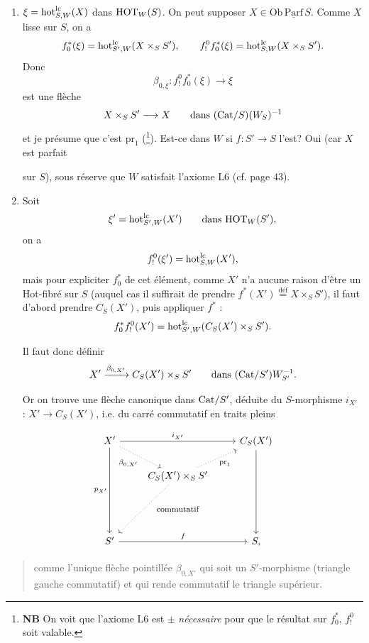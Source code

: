 \begin{enumerate}
\item[] $\xi=\mathrm{hot}^{\mathrm{lc}}_{S,W}(X)$ dans $\mathrm{HOT}_W(S)$. On peut supposer $X\in\mathrm{Ob}\,\underline{\mathrm{Parf}}\,S$. Comme $X$ lisse sur $S$, on a
\[f_0^*(\xi)=\mathrm{hot}^{\mathrm{lc}}_{S',W}(X\times_S S'),\qquad f_!^0f_0^*(\xi)=\mathrm{hot}^{\mathrm{lc}}_{S,W}(X\times_S S').\]
Donc
\[\beta_{0,\xi} : f_!^0f_0^*(\xi)\longrightarrow\xi\]
est une flèche
\[X\times_S S'\longrightarrow X\qquad\text{dans }(\mathrm{Cat}/S)(W_S)^{-1}\]
et je présume que c'est $\mathrm{pr}_1$ (\footnote[78]{\textbf{NB} On voit que l'axiome L6 est $\pm$ \textit{nécessaire} pour que le résultat sur $f_0^*$, $f_!^0$ soit valable.}). Est-ce dans $W$ si $f : S'\longrightarrow S$ l'est? Oui (car $X$ est parfait


sur $S$), sous réserve que $W$ satisfait l'axiome L6 (cf. page 43).

\item[2)] Soit
\[\xi'=\mathrm{hot}^{\mathrm{lc}}_{S',W}(X')\qquad\text{dans }\mathrm{HOT}_W(S'),\]
on a
\[f_!^0(\xi')=\mathrm{hot}^{\mathrm{lc}}_{S,W}(X'),\]
mais pour expliciter $f_0^*$ de cet élément, comme $X'$ n'a aucune raison d'être un Hot-fibré sur $S$ (auquel cas il suffirait de prendre $f^*(X')\overset{\text{déf}}{=}X\times_S S'$), il faut d'abord prendre $C_S(X')$, puis appliquer $f^*$ :
\[f_0^*f_!^0(X')=\mathrm{hot}^{\mathrm{lc}}_{S',W}(C_S(X')\times_S S').\]

Il faut donc définir
\[X'\xrightarrow{\beta_{0,X'}}C_S(X')\times_S S'\qquad\text{dans }(\mathrm{Cat}/S')W_{S'}^{-1}.\]

Or on trouve une flèche canonique dans $\mathrm{Cat}/S'$, déduite du $S$-morphisme $i_{X'}$ : $X'\longrightarrow C_S(X')$, i.e. du carré commutatif en traits pleins
\end{enumerate}

\noindent{}%
\[
\begin{tikzcd}
X' \arrow[rr, "i_{X'}"] \arrow[ddd, "p_{X'}"'] \arrow[dr, dotted, "\beta_{0,X'}"'] & & C_S(X') \arrow[ddd] \\
& C_S(X') \times_S S' \arrow[ur, dotted, "\pr_1"'] \arrow[ddl, dotted] & \\
& \text{\footnotesize commutatif} & \\
S' \arrow[rr, "f"] & & S,
\end{tikzcd}
\]

\begin{quote}
comme l'unique flèche pointillée $\beta_{0,X'}$ qui soit un $S'$-morphisme (triangle gauche commutatif) et qui rende commutatif le triangle supérieur.
\end{quote}


